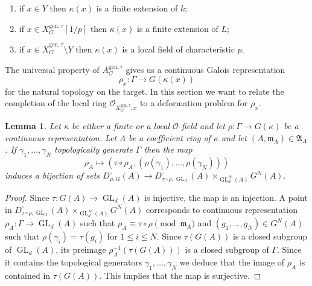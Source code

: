 \documentclass{amsart}
\newtheorem{lem}[prop]{Lemma}
\theoremstyle{definition}
\theoremstyle{remark}
\DeclareMathOperator{\GL}{GL}
\newcommand{\mm}{\mathfrak m}
\newcommand{\OO}{\mathcal O}
\newcommand{\gen}{\mathrm{gen}}
\newcommand{\Xbar}{\overline{X}}
\begin{document}
 \begin{enumerate}
 \item if $x\in Y$ then $\kappa(x)$ is a finite extension of $k$;
 \item if $x\in X^{\gen,\tau}_G[1/p]$ then $\kappa(x)$ is a finite extension of $L$;
 \item if $x\in \Xbar^{\gen,\tau}_G\setminus Y$ then $\kappa(x)$ is a local field of characteristic $p$.
 \end{enumerate}
The universal property of $A^{\gen,\tau}_G$ gives 
us a continuous Galois representation $$\rho_x: \Gamma \rightarrow G(\kappa(x))$$
for the natural topology on the target. In this section we 
want to relate the completion of the local ring $\OO_{X^{\gen,\tau}_G, x}$ 
to a deformation problem for $\rho_x$.







 
 \begin{lem}\label{deform} 
 Let $\kappa$ be either a finite or a local $\OO$-field
 and let $\rho: \Gamma\rightarrow G(\kappa)$ be a continuous representation. 
 Let $\Lambda$ be a coefficient ring of $\kappa$
and let $(A,\mm_A)\in \mathfrak A_{\Lambda}$. If $\gamma_1, \ldots, \gamma_N$ topologically generate $\Gamma$ then the map 
$$\rho_A\mapsto (\tau\circ \rho_A, (\rho(\gamma_1), \ldots, \rho(\gamma_N)))$$
induces a bijection of sets
$D^{\square}_{\rho,G}(A)\longrightarrow D^{\square}_{\tau\circ\rho,\GL_d}(A)\times_{\GL_d^N(A)}
G^N(A).$
\end{lem}
\begin{proof} Since $\tau: G(A)\rightarrow \GL_d(A)$ 
is injective, the map is an injection. A point 
in $D^{\square}_{\tau\circ\rho,\GL_d}(A)\times_{\GL_d^N(A)}G^N(A)$ corresponds to continuous representation 
$\rho_A: \Gamma \rightarrow \GL_d(A)$ such that 
$\rho_A \equiv \tau\circ \rho\pmod{\mm_A}$ and 
$(g_1, \ldots, g_N)\in G^N(A)$ such that 
$\rho(\gamma_i)=\tau(g_i)$ for $1\le i \le N$. 
Since $\tau(G(A))$ is a closed subgroup of $\GL_d(A)$, its preimage 
$\rho_A^{-1}( \tau(G(A)))$ is a closed subgroup of $\Gamma$. 
Since
it contains the topological generators $\gamma_1, \ldots, \gamma_N$ 
we deduce that the image of $\rho_A$ is contained  in $\tau(G(A))$. This implies that the map is surjective.
\end{proof}
\end{document}
